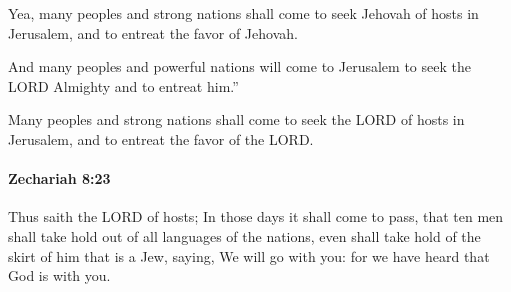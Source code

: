 			\begin{versebox}
					\item[BHS] 
					\item[LXX] 
					\item[ASV] Yea, many peoples and strong nations shall come to seek Jehovah of hosts in Jerusalem, and to entreat the favor of Jehovah.
					\item[NIV] And many peoples and powerful nations will come to Jerusalem to seek the LORD Almighty and to entreat him.”
					\item[NRSV] Many peoples and strong nations shall come to seek the LORD of hosts in Jerusalem, and to entreat the favor of the LORD.
			\end{versebox}

		\paragraph{Zechariah 8:23} %
			\label{ZECHARIAH-8-23}

			Thus saith the LORD of hosts; In those days it shall come to pass, that ten men shall take hold out of all languages of the nations, even shall take hold of the skirt of him that is a Jew, saying, We will go with you: for we have heard that God is with you.

